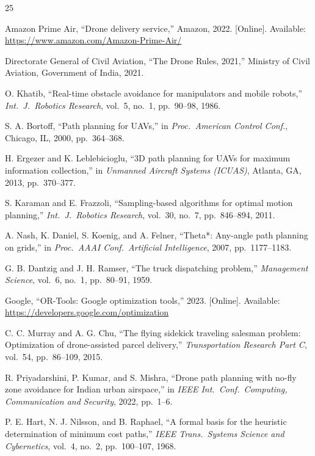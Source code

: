 \documentclass[11pt,a4paper,twocolumn]{article}
\begin{document}
\begin{thebibliography}{25}

Amazon Prime Air, ``Drone delivery service,'' Amazon, 2022. [Online]. Available: \url{https://www.amazon.com/Amazon-Prime-Air/}

Directorate General of Civil Aviation, ``The Drone Rules, 2021,'' Ministry of Civil Aviation, Government of India, 2021.

O. Khatib, ``Real-time obstacle avoidance for manipulators and mobile robots,'' \textit{Int.\ J.\ Robotics Research}, vol.~5, no.~1, pp.~90--98, 1986.

S. A. Bortoff, ``Path planning for UAVs,'' in \textit{Proc.\ American Control Conf.}, Chicago, IL, 2000, pp.~364--368.

H. Ergezer and K. Leblebicioglu, ``3D path planning for UAVs for maximum information collection,'' in \textit{Unmanned Aircraft Systems (ICUAS)}, Atlanta, GA, 2013, pp.~370--377.

S. Karaman and E. Frazzoli, ``Sampling-based algorithms for optimal motion planning,'' \textit{Int.\ J.\ Robotics Research}, vol.~30, no.~7, pp.~846--894, 2011.

A. Nash, K. Daniel, S. Koenig, and A. Felner, ``Theta*: Any-angle path planning on grids,'' in \textit{Proc.\ AAAI Conf.\ Artificial Intelligence}, 2007, pp.~1177--1183.

G. B. Dantzig and J. H. Ramser, ``The truck dispatching problem,'' \textit{Management Science}, vol.~6, no.~1, pp.~80--91, 1959.

Google, ``OR-Tools: Google optimization tools,'' 2023. [Online]. Available: \url{https://developers.google.com/optimization}

C. C. Murray and A. G. Chu, ``The flying sidekick traveling salesman problem: Optimization of drone-assisted parcel delivery,'' \textit{Transportation Research Part C}, vol.~54, pp.~86--109, 2015.

R. Priyadarshini, P. Kumar, and S. Mishra, ``Drone path planning with no-fly zone avoidance for Indian urban airspace,'' in \textit{IEEE Int.\ Conf.\ Computing, Communication and Security}, 2022, pp.~1--6.

P. E. Hart, N. J. Nilsson, and B. Raphael, ``A formal basis for the heuristic determination of minimum cost paths,'' \textit{IEEE Trans.\ Systems Science and Cybernetics}, vol.~4, no.~2, pp.~100--107, 1968.


\end{thebibliography}
\end{document}
